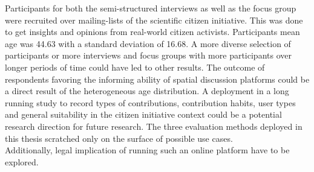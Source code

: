 Participants for both the semi-structured interviews as well as the focus group were recruited over mailing-lists of the scientific citizen initiative. This was done to get insights and opinions from real-world citizen activists. Participants mean age was 44.63 with a standard deviation of 16.68. A more diverse selection of participants or more interviews and focus groups with more participants over longer periods of time could have led to other results. The outcome of respondents favoring the informing ability of spatial discussion platforms could be a direct result of the heterogeneous age distribution. A deployment in a long running study to record types of contributions, contribution habits, user types and general suitability in the citizen initiative context could be a potential research direction for future research. The three evaluation methods deployed in this thesis scratched only on the surface of possible use cases.\\
Additionally, legal implication of running such an online platform have to be explored.
